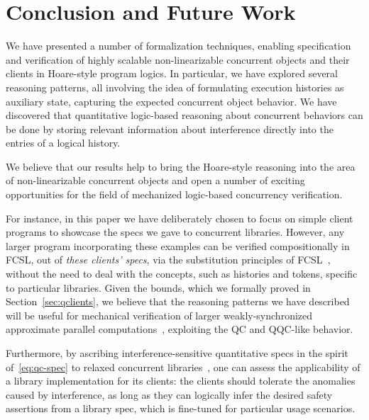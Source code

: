 
\section{Conclusion and Future Work}
\label{sec:conclusion}


We have presented a number of formalization techniques, enabling
specification and verification of highly scalable non-linearizable
concurrent objects and their clients in Hoare-style program logics.
%
In particular, we have explored several reasoning patterns, all
involving the idea of formulating execution histories as auxiliary
state, capturing the expected concurrent object behavior.
%
We have discovered that quantitative logic-based reasoning about
concurrent behaviors can be done by storing relevant information about
interference directly into the entries of a logical history.

We believe that our results help to bring the Hoare-style reasoning
into the area of non-linearizable concurrent objects and open a number
of exciting opportunities for the field of mechanized logic-based
concurrency verification.

For instance, in this paper we have deliberately chosen to focus on
simple client programs to showcase the specs we gave to concurrent
libraries. However, any larger program incorporating these examples
can be verified compositionally in FCSL, out of \emph{these clients'
  specs}, via the substitution principles of
FCSL~\cite{Nanevski-al:ESOP14,Sergey-al:PLDI15}, without the need to
deal with the concepts, such as histories and tokens, specific to
particular libraries. Given the bounds, which we formally proved in
Section~\ref{sec:qclients}, we believe that the reasoning patterns we
have described will be useful for mechanical verification of larger
weakly-synchronized approximate parallel
computations~\cite{Rinard:RACES}, exploiting the QC and QQC-like
behavior.

Furthermore, by ascribing interference-sensitive quantitative specs in
the spirit of~\eqref{eq:qc-spec} to relaxed concurrent
libraries~\cite{Henzinger-al:POPL13}, one can assess the applicability
of a library implementation for its clients: the clients should
tolerate the anomalies caused by interference, as long as they can
logically infer the desired safety assertions from a library spec,
which is fine-tuned for particular usage scenarios.



